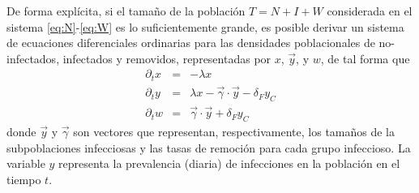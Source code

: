 \documentclass[8pt]{article}
\newcommand{\vertex}{\node[vertex]}
\begin{document}
\bigskip
\begin{minipage}{0.6\textwidth}
De forma explícita, si el tamaño de la población $T=N+I+W$ considerada en el sistema \eqref{eq:N}-\eqref{eq:W} es lo suficientemente grande, es posible derivar un sistema de ecuaciones diferenciales ordinarias para las densidades poblacionales de no-infectados, infectados y removidos, representadas por $x$, $\vec{y}$, y $w$, de tal forma que
\begin{eqnarray*}
\partial_{t} x &=& -  \lambda x\\
\partial_{t} y &=& \lambda x - \vec{\gamma} \cdot \vec{y}  - \delta_{F} y_{C}
\\
\partial_{t} w &=&\vec{\gamma} \cdot \vec{y} + \delta_{F} y_{C}
\end{eqnarray*}
donde $\vec{y}$ y  $\vec{\gamma}$  son  vectores que representan, respectivamente,  los tamaños de la subpoblaciones infecciosas y las tasas de remoción para cada grupo infeccioso. La variable $y$ representa la prevalencia (diaria) de infecciones en la población en el tiempo $t$.
\end{minipage}%
\begin{minipage}{0.4\textwidth}
\centering
{}
\end{minipage}%
\end{document}
